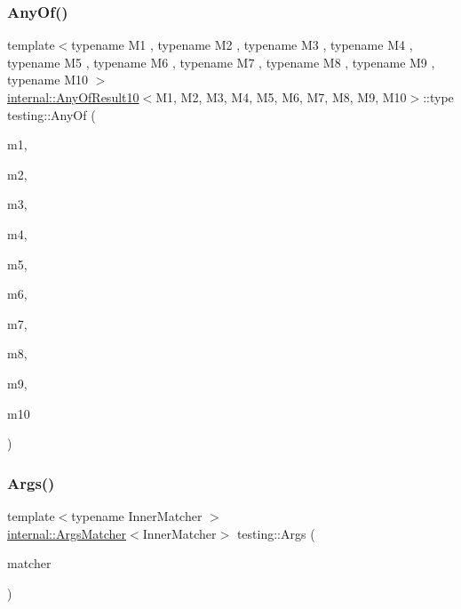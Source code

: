 \mbox{\label{namespacetesting_a1797921d3ed04c7f13dfa8f36bf0bf1c}} 
\subsubsection{\texorpdfstring{Any\+Of()}{AnyOf()}\hspace{0.1cm}{\footnotesize\ttfamily [9/9]}}
{\footnotesize\ttfamily template$<$typename M1 , typename M2 , typename M3 , typename M4 , typename M5 , typename M6 , typename M7 , typename M8 , typename M9 , typename M10 $>$ \\
\hyperlink{structtesting_1_1internal_1_1_any_of_result10}{internal\+::\+Any\+Of\+Result10}$<$M1, M2, M3, M4, M5, M6, M7, M8, M9, M10$>$\+::type testing\+::\+Any\+Of (\begin{DoxyParamCaption}\item[{M1}]{m1,  }\item[{M2}]{m2,  }\item[{M3}]{m3,  }\item[{M4}]{m4,  }\item[{M5}]{m5,  }\item[{M6}]{m6,  }\item[{M7}]{m7,  }\item[{M8}]{m8,  }\item[{M9}]{m9,  }\item[{M10}]{m10 }\end{DoxyParamCaption})\hspace{0.3cm}{\ttfamily [inline]}}

\mbox{\label{namespacetesting_aaca153f67b689b8b9d5b8c67ecf8cee4}} 
\subsubsection{\texorpdfstring{Args()}{Args()}\hspace{0.1cm}{\footnotesize\ttfamily [1/11]}}
{\footnotesize\ttfamily template$<$typename Inner\+Matcher $>$ \\
\hyperlink{classtesting_1_1internal_1_1_args_matcher}{internal\+::\+Args\+Matcher}$<$Inner\+Matcher$>$ testing\+::\+Args (\begin{DoxyParamCaption}\item[{const Inner\+Matcher \&}]{matcher }\end{DoxyParamCaption})\hspace{0.3cm}{\ttfamily [inline]}}

